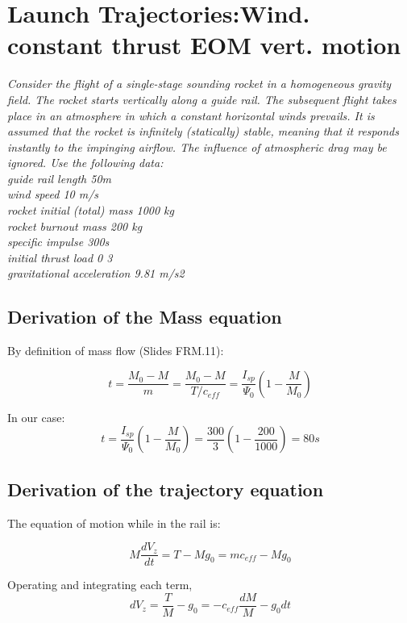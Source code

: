\section{ Launch Trajectories:Wind. constant thrust EOM vert. motion }\label{sec:q4}    


\textit{Consider the flight of a single-stage sounding rocket in a homogeneous gravity field. The rocket starts vertically along a guide rail. The subsequent flight takes place in an atmosphere in which a constant horizontal winds prevails. It is assumed that the rocket is infinitely (statically) stable, meaning that it responds instantly to the impinging airflow. The influence of atmospheric drag may be ignored. Use the following data: \\
guide rail length 50m\\
wind speed 10 m/s\\
rocket initial (total) mass 1000 kg\\
rocket burnout mass 200 kg\\
specific impulse 300s\\
initial thrust load  0 3\\
gravitational acceleration 9.81 m/s2
}

\subsection{Derivation of the Mass equation}

By definition of mass flow (Slides FRM.11): 

\begin{equation}
t = \frac{M_0-M}{m} = \frac{M_0-M}{T/c_{eff}}= \frac{I_{sp}}{\Psi_0}(1-\frac{M}{M_0})
\label{eq:1}
\end{equation}

In our case: 
$$ t = \frac{I_{sp}}{\Psi_0}(1-\frac{M}{M_0}) =  \frac{300}{3}(1-\frac{200}{1000}) = 80 s$$
\subsection{Derivation of the trajectory equation}

The equation of motion while in the rail is: 

\begin{equation}
	M\frac{dV_z}{dt} = T - Mg_0 = mc_{eff} - Mg_0
\end{equation}

Operating and integrating each term, 
\begin{equation}
dV_z = \frac{T}{M} - g_0 = - c_{eff} \frac{dM}{M} - g_0 dt
\end{equation}

